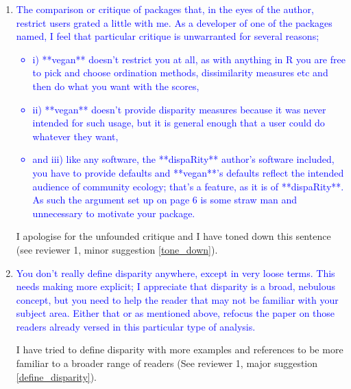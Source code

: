 \documentclass[12pt,letterpaper]{article}
\begin{document}
\begin{enumerate}
\item{\textcolor{blue}{The comparison or critique of packages that, in the eyes of the author, restrict users grated a little with me. As a developer of one of the packages named, I feel that particular critique is unwarranted for several reasons;
\begin{itemize}
\item i) **vegan** doesn't restrict you at all, as with anything in R you are free to pick and choose ordination methods, dissimilarity measures etc and then do what you want with the scores,
\item ii) **vegan** doesn't provide disparity measures because it was never intended for such usage, but it is general enough that a user could do whatever they want,
\item and iii) like any software, the **dispaRity** author's software included, you have to provide defaults and **vegan**'s defaults reflect the intended audience of community ecology; that's a feature, as it is of **dispaRity**. As such the argument set up on page 6 is some straw man and unnecessary to motivate your package.
\end{itemize}
}}

I apologise for the unfounded critique and I have toned down this sentence (see reviewer 1, minor suggestion \ref{tone_down}).

\item{\textcolor{blue}{You don't really define disparity anywhere, except in very loose terms.
This needs making more explicit; I appreciate that disparity is a broad, nebulous concept, but you need to help the reader that may not be familiar with your subject area.
Either that or as mentioned above, refocus the paper on those readers already versed in this particular type of analysis.}}
\label{nebulous}

I have tried to define disparity with more examples and references to be more familiar to a broader range of readers (See reviewer 1, major suggestion \ref{define_disparity}).



\end{enumerate}
\end{document}
